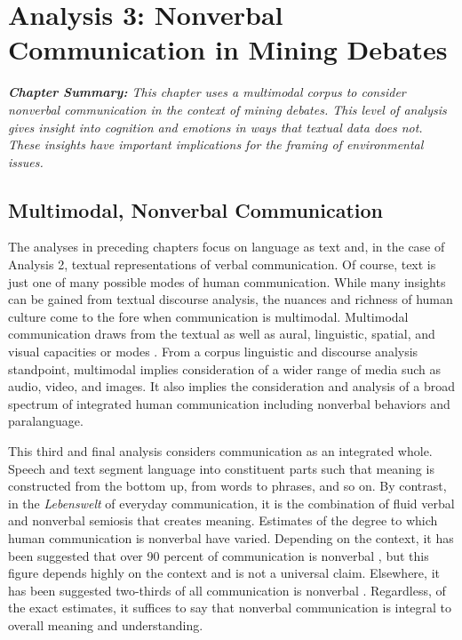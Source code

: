 \chapter{Analysis 3: Nonverbal Communication in Mining Debates}

\textit{\textbf{Chapter Summary:} This chapter uses a multimodal corpus to consider nonverbal communication in the context of mining debates. This level of analysis gives insight into cognition and emotions in ways that textual data does not. These insights have important implications for the framing of environmental issues.}
\newline

\section{Multimodal, Nonverbal Communication}

The analyses in preceding chapters focus on language as text and, in the case of Analysis 2, textual representations of verbal communication. Of course, text is just one of many possible modes of human communication. While many insights can be gained from textual discourse analysis, the nuances and richness of human culture come to the fore when communication is multimodal. Multimodal communication draws from the textual as well as aural, linguistic, spatial, and visual capacities or modes \citep{Murray2013}. From a corpus linguistic and discourse analysis standpoint, multimodal implies consideration of a wider range of media such as audio, video, and images. It also implies the consideration and analysis of a broad spectrum of integrated human communication including nonverbal behaviors and paralanguage.  

This third and final analysis considers communication as an integrated whole. Speech and text segment language into constituent parts such that meaning is constructed from the bottom up, from words to phrases, and so on. By contrast, in the \textit{Lebenswelt} of everyday communication, it is the combination of fluid verbal and nonverbal semiosis that creates meaning. Estimates of the degree to which human communication is nonverbal have varied. Depending on the context, it has been suggested that over 90 percent of communication is nonverbal \citep{Mehrabian1972}, but this figure depends highly on the context and is not a universal claim. Elsewhere, it has been suggested two-thirds of all communication is nonverbal \citep{Burgoon2016}. Regardless, of the exact estimates, it suffices to say that nonverbal communication is integral to overall meaning and understanding.

